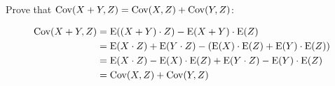 \question Prove that $\text{Cov}(X + Y, Z) = \text{Cov}(X, Z) + \text{Cov}(Y, Z)$:
\begin{solution}
\begin{equation}
\begin{split}
\text{Cov}(X + Y, Z) &= \text{E}((X + Y) \cdot Z) - \text{E}(X + Y) \cdot \text{E}(Z) \\ \nonumber
	          &= \text{E}(X \cdot Z) + \text{E}(Y \cdot Z) - (\text{E}(X) \cdot \text{E}(Z) + 
	          \text{E}(Y) \cdot \text{E}(Z)) \\
           &= \text{E}(X \cdot Z) - \text{E}(X) \cdot \text{E}(Z) + \text{E}(Y \cdot Z) - 
           \text{E}(Y) \cdot \text{E}(Z) \\
           &= \text{Cov}(X, Z) + \text{Cov}(Y, Z) 
\end{split}
\end{equation}
\end{solution}